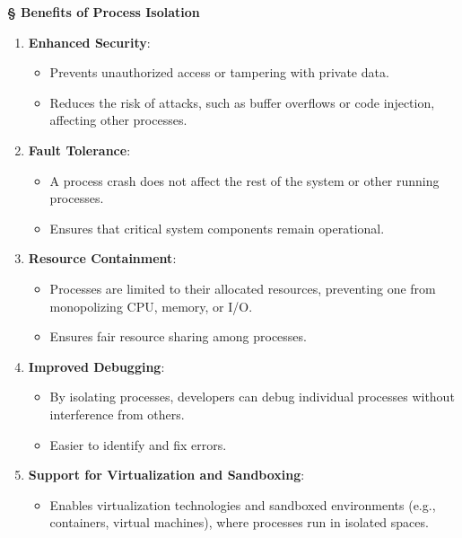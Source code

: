 \documentclass[a4paper]{book}
\newcommand{\sfbf}[1]{{\normalsize\textsf{\textbf{§ #1}}}}
\begin{document}
\sfbf{Benefits of Process Isolation}

\begin{enumerate}
\item 
\textbf{Enhanced Security}:
\begin{itemize}
\item 
Prevents unauthorized access or tampering with private data.

\item 
Reduces the risk of attacks, such as buffer overflows or code injection, affecting other processes.

\end{itemize}

\item 
\textbf{Fault Tolerance}:
\begin{itemize}
\item 
A process crash does not affect the rest of the system or other running processes.

\item 
Ensures that critical system components remain operational.

\end{itemize}

\item 
\textbf{Resource Containment}:
\begin{itemize}
\item 
Processes are limited to their allocated resources, preventing one from monopolizing CPU, memory, or I/O.

\item 
Ensures fair resource sharing among processes.

\end{itemize}

\item 
\textbf{Improved Debugging}:
\begin{itemize}
\item 
By isolating processes, developers can debug individual processes without interference from others.

\item 
Easier to identify and fix errors.

\end{itemize}

\item 
\textbf{Support for Virtualization and Sandboxing}:
\begin{itemize}
\item 
Enables virtualization technologies and sandboxed environments (e.g., containers, virtual machines), where processes run in isolated spaces.

\end{itemize}

\end{enumerate}
\hrulefill
\end{document}
